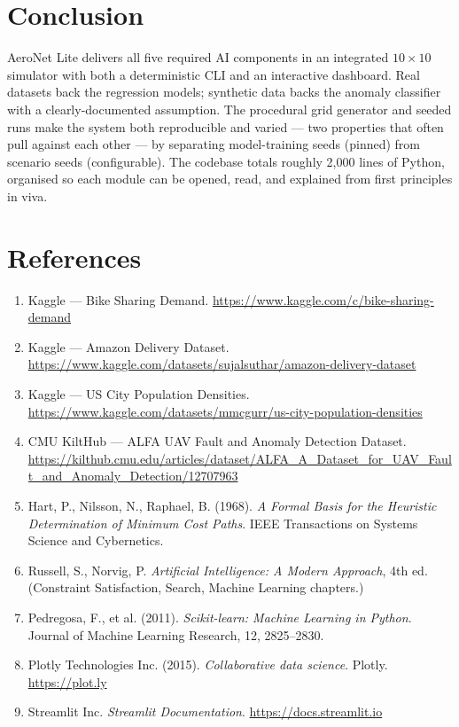 \documentclass[11pt,a4paper]{article}
\begin{document}
\section{Conclusion}
\label{sec:conclusion}

AeroNet Lite delivers all five required AI components in an integrated
$10\!\times\!10$ simulator with both a deterministic CLI and an
interactive dashboard. Real datasets back the regression models;
synthetic data backs the anomaly classifier with a clearly-documented
assumption. The procedural grid generator and seeded runs make the system
both reproducible and varied --- two properties that often pull against
each other --- by separating model-training seeds (pinned) from
scenario seeds (configurable). The codebase totals roughly 2{,}000 lines
of Python, organised so each module can be opened, read, and explained
from first principles in viva.

\section*{References}
\label{sec:refs}

\begin{enumerate}[leftmargin=*]
  \item Kaggle --- Bike Sharing Demand. \url{https://www.kaggle.com/c/bike-sharing-demand}
  \item Kaggle --- Amazon Delivery Dataset. \url{https://www.kaggle.com/datasets/sujalsuthar/amazon-delivery-dataset}
  \item Kaggle --- US City Population Densities. \url{https://www.kaggle.com/datasets/mmcgurr/us-city-population-densities}
  \item CMU KiltHub --- ALFA UAV Fault and Anomaly Detection Dataset. \url{https://kilthub.cmu.edu/articles/dataset/ALFA_A_Dataset_for_UAV_Fault_and_Anomaly_Detection/12707963}
  \item Hart, P., Nilsson, N., Raphael, B. (1968). \emph{A Formal Basis for the Heuristic Determination of Minimum Cost Paths}. IEEE Transactions on Systems Science and Cybernetics.
  \item Russell, S., Norvig, P. \emph{Artificial Intelligence: A Modern Approach}, 4th ed. (Constraint Satisfaction, Search, Machine Learning chapters.)
  \item Pedregosa, F., et al. (2011). \emph{Scikit-learn: Machine Learning in Python}. Journal of Machine Learning Research, 12, 2825--2830.
  \item Plotly Technologies Inc. (2015). \emph{Collaborative data science}. Plotly. \url{https://plot.ly}
  \item Streamlit Inc. \emph{Streamlit Documentation}. \url{https://docs.streamlit.io}
\end{enumerate}
\end{document}
